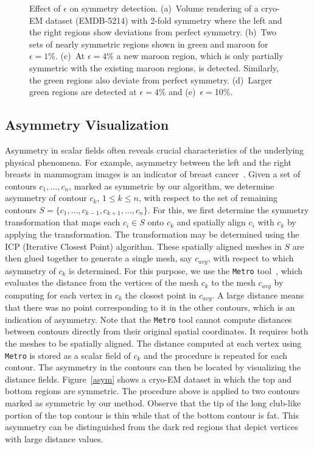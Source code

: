 \documentclass[review,journal]{vgtc}         %
\begin{document}
\begin{figure*}[t]
	\centering
	\caption{\label{eps}Effect of $\epsilon$ on symmetry detection. (a)~Volume rendering of a cryo-EM dataset (EMDB-5214)
		with 2-fold symmetry where the left and the right regions show deviations from perfect symmetry.
		(b)~Two sets of nearly symmetric regions shown in green and maroon for $\epsilon=1$\%. (c)~At
		$\epsilon=4$\% a new maroon region, which is only partially symmetric with the existing maroon regions, is detected. 
		Similarly, the green regions also deviate from perfect symmetry. (d)~Larger green regions are detected at 
		$\epsilon=4$\% and (e)~$\epsilon=$10\%.}
\end{figure*}
\subsection{Asymmetry Visualization}
Asymmetry in scalar fields often reveals crucial characteristics of the underlying
physical phenomena. For example, asymmetry between 
the left and the right breasts in mammogram images is an indicator of breast 
cancer~\cite{tahmoush2007improved}.
Given a set of contours $c_1,\dots,c_n$, marked as symmetric
by our algorithm, we determine asymmetry of contour $c_k$, $1 \leq k \leq n$, with
respect to the set of remaining contours $S = \{c_1, \dots, c_{k-1}, c_{k+1}, \dots, c_n\}$.
For this, we first determine the symmetry transformation that maps each $c_i \in S$ onto
$c_k$ and spatially align $c_i$ with $c_k$ by applying the transformation. 
The transformation may be determined using the ICP (Iterative Closest Point) algorithm.
These spatially aligned meshes in $S$ are then glued together to generate a single mesh, say $c_{avg}$, 
with respect to which asymmetry of $c_k$ is determined. For this purpose, we use the 
\texttt{Metro} tool~\cite{CigRS98}, which evaluates the distance from the vertices of the mesh 
$c_k$ to the mesh $c_{avg}$ by computing for each vertex in $c_k$ the closest point in $c_{avg}$. 
A large distance means that there was no point corresponding to it in the other contours,
which is an indication of asymmetry. Note that the \texttt{Metro} tool cannot compute distances 
between contours directly from their original spatial coordinates. 
It requires both the meshes to be spatially aligned. 
The distance computed at each vertex using \texttt{Metro} is stored as a scalar field of 
$c_k$ and the procedure is repeated
for each contour. The asymmetry in the contours can then be located by visualizing the distance fields.
Figure~\ref{asym} shows a cryo-EM dataset in which the top and bottom regions are symmetric. The procedure
above is applied to two contours marked as symmetric by our method. Observe that the tip of the long
club-like portion of the top contour is thin while that of the bottom contour is fat. This asymmetry
can be distinguished from the dark red regions that depict vertices with large distance values.
\end{document}
